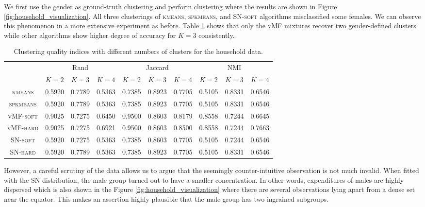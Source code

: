 \documentclass[11pt]{article}
\begin{document}
We first use the gender as ground-truth clustering and perform clustering where the results are shown in Figure \ref{fig:household_visualization}. All three clusterings of \textsc{kmeans}, \textsc{spkmeans}, and \textsc{SN-soft} algorithms misclassified some females. We can observe this phenomenon in a more extensive experiment as before. Table \ref{table:household_compare} shows that only the \textsc{vMF} mixtures recover two gender-defined clusters while other algorithms show higher degree of accuracy for $K=3$ consistently. 

\begin{table}[ht]
	\begin{center}
		\begin{tabular}{|c|c|c|c|c|c|c|c|c|c|}
			\hline
			\multirow{2}{*}{} & \multicolumn{3}{c|}{Rand} & \multicolumn{3}{c|}{Jaccard} & \multicolumn{3}{c|}{NMI} \\ \cline{2-10} 
			& $K=2$     & $K=3$    & $K=4$    & $K=2$      & $K=3$     & $K=4$     & $K=2$   & $K=3$   & $K=4$    \\ \hline
\textsc{kmeans} & 0.5920 & 0.7789 & 0.5363 & 0.7385 & 0.8923 & 0.7705 & 0.5105 & 0.8331 & 0.6546 \\ \hline
\textsc{spkmeans} & 0.5920 & 0.7789 & 0.5363 & 0.7385 & 0.8923 & 0.7705 & 0.5105 & 0.8331 & 0.6546 \\ \hline
\textsc{vMF-soft} & 0.9025 & 0.7275 & 0.6450 & 0.9500 & 0.8603 & 0.8179 & 0.8558 & 0.7244 & 0.6645 \\ \hline
\textsc{vMF-hard} & 0.9025 & 0.7275 & 0.6921 & 0.9500 & 0.8603 & 0.8500 & 0.8558 & 0.7244 & 0.7663 \\ \hline
\textsc{SN-soft} & 0.5920 & 0.7275 & 0.5363 & 0.7385 & 0.8603 & 0.7705 & 0.5105 & 0.7244 & 0.6546 \\ \hline
\textsc{SN-hard} & 0.5920 & 0.7789 & 0.5363 & 0.7385 & 0.8923 & 0.7705 & 0.5105 & 0.8331 & 0.6546 \\ \hline
		\end{tabular}
	\end{center}
	\caption{Clustering quality indices with different numbers of clusters for the \textsf{household} data.}
	\label{table:household_compare}
\end{table}


However, a careful scrutiny of the data allows us  to argue that the seemingly counter-intuitive observation is not much invalid. When fitted with the SN distribution, the male group turned out to have a smaller concentration. In other words, expenditures of males are highly dispersed which is also shown in the Figure \ref{fig:household_visualization} where there are several observations lying apart from a dense set near the equator. This makes an assertion highly plausible that the male group has two ingrained subgroups. 
\end{document}
